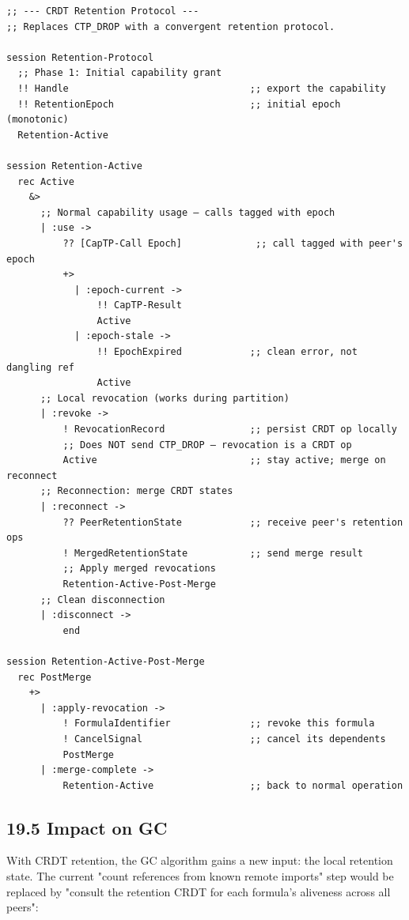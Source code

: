 \documentclass[11pt]{article}
\begin{document}
\begin{verbatim}
;; --- CRDT Retention Protocol ---
;; Replaces CTP_DROP with a convergent retention protocol.

session Retention-Protocol
  ;; Phase 1: Initial capability grant
  !! Handle                                ;; export the capability
  !! RetentionEpoch                        ;; initial epoch (monotonic)
  Retention-Active

session Retention-Active
  rec Active
    &>
      ;; Normal capability usage — calls tagged with epoch
      | :use ->
          ?? [CapTP-Call Epoch]             ;; call tagged with peer's epoch
          +>
            | :epoch-current ->
                !! CapTP-Result
                Active
            | :epoch-stale ->
                !! EpochExpired            ;; clean error, not dangling ref
                Active
      ;; Local revocation (works during partition)
      | :revoke ->
          ! RevocationRecord               ;; persist CRDT op locally
          ;; Does NOT send CTP_DROP — revocation is a CRDT op
          Active                           ;; stay active; merge on reconnect
      ;; Reconnection: merge CRDT states
      | :reconnect ->
          ?? PeerRetentionState            ;; receive peer's retention ops
          ! MergedRetentionState           ;; send merge result
          ;; Apply merged revocations
          Retention-Active-Post-Merge
      ;; Clean disconnection
      | :disconnect ->
          end

session Retention-Active-Post-Merge
  rec PostMerge
    +>
      | :apply-revocation ->
          ! FormulaIdentifier              ;; revoke this formula
          ! CancelSignal                   ;; cancel its dependents
          PostMerge
      | :merge-complete ->
          Retention-Active                 ;; back to normal operation
\end{verbatim}
\subsection{19.5 Impact on GC}
\label{sec:org2f43b70}

With CRDT retention, the GC algorithm gains a new input: the local
retention state. The current "count references from known remote imports"
step would be replaced by "consult the retention CRDT for each formula's
aliveness across all peers":
\end{document}
